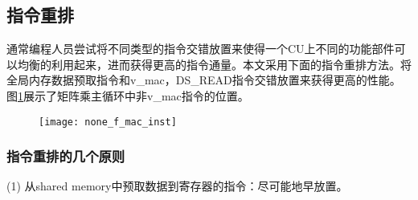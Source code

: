 \subsection{指令重排}
通常编程人员尝试将不同类型的指令交错放置来使得一个CU上不同的功能部件可以均衡的利用起来，进而获得更高的指令通量。本文采用下面的指令重排方法。将全局内存数据预取指令和v\_mac，DS\_READ指令交错放置来获得更高的性能。图\ref{fig:none_f_mac_inst}展示了矩阵乘主循环中非v\_mac指令的位置。
\begin{figure}[htbp]
	\centering
	\texttt{[image: none\_f\_mac\_inst]}
	\label{fig:none_f_mac_inst}
\end{figure}

%	
%	


\subsubsection{指令重排的几个原则}
(1) 从shared memory中预取数据到寄存器的指令：尽可能地早放置。

